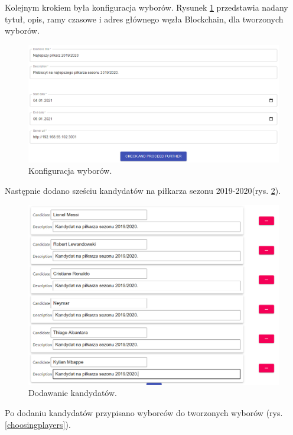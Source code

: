 \documentclass[a4paper,12pt]{book}
\begin{document}
Kolejnym krokiem była konfiguracja wyborów. Rysunek \ref{bestplayercfg} przedstawia nadany tytuł, opis, ramy czasowe i adres głównego węzła Blockchain, dla tworzonych wyborów.

\begin{figure}[H]
  \centering
\includegraphics[width=\textwidth]{images/bestplayercfg.png}
\caption{Konfiguracja wyborów.}\label{bestplayercfg}
\end {figure}

Następnie dodano sześciu kandydatów na piłkarza sezonu 2019-2020(rys. \ref{addedplayers}).

\begin{figure}[H]
  \centering
\includegraphics[width=\textwidth]{images/addedplayers.png}
\caption{Dodawanie kandydatów.}\label{addedplayers}
\end {figure}

Po dodaniu kandydatów przypisano wyborców do tworzonych wyborów (rys. \ref{choosingplayers}). 
\end{document}
